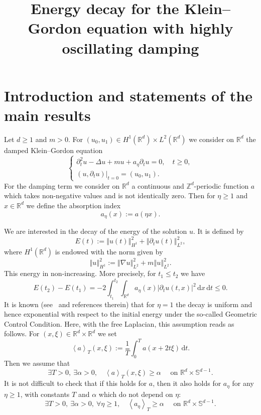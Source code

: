 \documentclass[AHL,Unicode,longabstracts]{cedram}
\author{\firstname{Julien} \lastname{Royer}}
\title[Klein--Gordon equation with highly oscillating damping]{Energy decay for the Klein--Gordon equation with highly oscillating damping}
\newcommand{\abs}[1]{\left\vert #1\right\vert}
\newcommand{\nr}[1]{\left\Vert #1\right\Vert}
\newcommand{\pppg}[1] {\left< #1 \right>}
\renewcommand{\leq}{\leqslant}
\renewcommand{\geq}{\geqslant}
\newcommand{\1}{\mathds 1}
\newcommand{\R}{\mathbb{R}}
\renewcommand{\a}{\alpha}
\newcommand{\D}{\Delta}
\newcommand{\x}{\xi}
\newcommand{\dd}{\mathrm{d}}
\newcommand{\dx}{\dd x}
\newcommand{\dt}{\dd t}
\let\oldexists\exists
\renewcommand*{\exists}{\mathrel{\oldexists}}
\let\oldforall\forall
\renewcommand*{\forall}{\mathrel{\oldforall}}
\begin{document}
\enlargethispage{12pt}
\maketitle

\section{Introduction and statements of the main results}

Let $d \geq 1$ and $m> 0$. For $(u_0,u_1) \in H^1(\R^d)\times L^2(\R^d)$ we consider on $\R^d$ the damped Klein--Gordon equation
\begin{equation}\label{KG}
\begin{cases}
\partial_t^2 u -\D u + mu + a_\eta \partial_t u = 0, \quad t \geq 0,\\
(u,\partial_t u)|_{t=0} = (u_0,u_1).
\end{cases}
\end{equation}
For the damping term we consider on $\R^d$ a continuous and $\mathbb Z^d$-periodic function $a$ which takes non-negative values and is not identically zero. Then for $\eta \geq 1$ and $x \in \R^d$ we define the absorption index
\[
a_\eta(x) := a(\eta x).
\]



We are interested in the decay of the energy of the solution $u$. It is defined by
\[
E(t) := \nr{u(t)}_{H^1}^2 + \nr{\partial_t u(t)}_{L^2}^2,
\]
where $H^1(\R^d)$ is endowed with the norm given by
\begin{equation}\label{def-norme-H1}
\nr{u}_{H^1}^2 := \nr{\nabla u}_{L^2}^2 + m \nr{u}_{L^2}^2.
\end{equation}
This energy in non-increasing. More precisely, for $t_1 \leq t_2$ we have
\[
E(t_2) - E(t_1) = -2 \int_{t_1}^{t_2} \int_{\R^d} a_\eta(x) \abs{\partial_t u(t,x)}^2 \, \dx \, \dt \leq 0.
\]
It is known (see~\cite{BurqJo} and references therein) that for $\eta = 1$ the decay is uniform and hence exponential with respect to the initial energy under the so-called Geometric Control Condition. Here, with the free Laplacian, this assumption reads as follows. For $(x,\x) \in \R^d \times \R^d$ we set
\[
\pppg {a}_T (x,\x) := \frac 1 T \int_0^T a(x+2t\x) \, \dt.
\]
Then we assume that
\begin{equation}\label{hyp-GCC-usual}
\exists T > 0,\ \exists \a > 0, \quad \pppg {a}_T (x,\x) \geq \a\quad \text{ on } \R^{d} \times \mathbb S^{d-1}.
\end{equation}
It is not difficult to check that if this holds for $a$, then it also holds for $a_\eta$ for any $\eta \geq 1$, with constants $T$ and $\a$ which do not depend on $\eta$:
\begin{equation}\label{hyp-GCC-unif}
\exists T > 0,\ \exists \a > 0,\ \forall \eta \geq 1, \quad \pppg {a_\eta}_T \geq \a \quad \text{ on } \R^{d} \times \mathbb S^{d-1}.
\end{equation}
\end{document}

